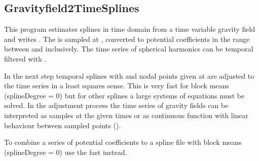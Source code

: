 \clearpage
\subsection{Gravityfield2TimeSplines}\label{Gravityfield2TimeSplines}
This program estimates splines in time domain from a time variable gravity field
and writes .
The  is sampled at , converted to potential coefficients
in the range between  and  inclusively.
The time series of spherical harmonics can be temporal filtered with .

In the next step temporal splines with  and nodal points given
at  are adjusted to the time series in a least squares sense.
This is very fast for block means (splineDegree = 0) but for other splines a large systems of equations
must be solved. In the adjustment process the time series of gravity fields can be interpreted as samples
at the given times or as continuous function with linear behaviour between sampled points ().

To combine a series of potential coefficients to a spline file with block means (splineDegree = 0)
use the fast  instead.


